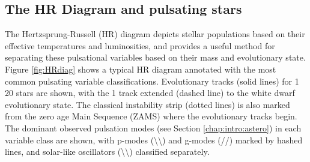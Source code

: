 \subsection{The HR Diagram and pulsating stars}

The Hertzsprung-Russell (HR) diagram depicts stellar populations based on their effective temperatures and luminosities, and provides a useful method for separating these pulsational variables based on their mass and evolutionary state. Figure \ref{fig:HRdiag} shows a typical HR diagram annotated with the most common pulsating variable classifications. Evolutionary tracks (solid lines) for 1\Msol{} \textendash{} 20\Msol{} stars are shown, with the 1\Msol{} track extended (dashed line) to the white dwarf evolutionary state. The classical instability strip (dotted lines) is also marked from the zero age Main Sequence (ZAMS) where the evolutionary tracks begin. The dominant observed pulsation modes (see Section \ref{chap:intro:astero}) in each variable class are shown, with p-modes (\textbackslash\textbackslash) and g-modes (//) marked by hashed lines, and solar-like oscillators (\textbackslash\textbackslash) classified separately. %

